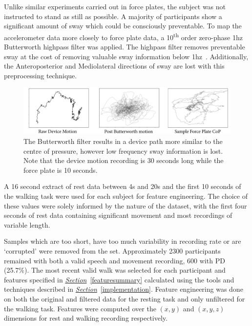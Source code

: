 \documentclass[12pt, twoside]{book}
\begin{document}
Unlike similar experiments carried out in force plates, the subject was not instructed to stand as still as possible. A majority of participants show a significant amount of sway which could be consciously preventable. To map the accelerometer data more closely to force plate data, a 10\textsuperscript{th} order zero-phase 1hz Butterworth highpass filter was applied. The highpass filter removes preventable sway at the cost of removing valuable sway information below 1hz~\cite{swayspectral}. Additionally, the Anteroposterior and Mediolateral directions of sway are lost with this preprocessing technique.

\begin{figure}[h]
	\label{butterworth}
	\centering\centerline{\includegraphics[width=1.15\linewidth]{butterworth.png}}
	\caption{The Butterworth filter results in a device path more similar to the centre of pressure, however low frequency sway information is lost. Note that the device motion recording is 30 seconds long while the force plate is 10 seconds.}
\end{figure}

A 16 second extract of rest data between 4s and 20s and the first 10 seconds of the walking task were used for each subject for feature engineering. The choice of these values were solely informed by the nature of the dataset, with the first four seconds of rest data containing significant movement and most recordings of variable length.

Samples which are too short, have too much variability in recording rate or are `corrupted' were removed from the set. Approximately 2300 participants remained with both a valid speech and movement recording, 600 with PD (25.7\%). The most recent valid walk was selected for each participant and features specified in \textit{\hyperref[featuresummary]{Section}}~\ref{featuresummary} calculated using the tools and techniques described in \textit{\hyperref[implementation]{Section}}~\ref{implementation}.  Feature engineering was done on both the original and filtered data for the resting task and only unfiltered for the walking task. Features were computed over the $(x,y)$ and $(x,y,z)$ dimensions for rest and walking recording respectively.
\end{document}
